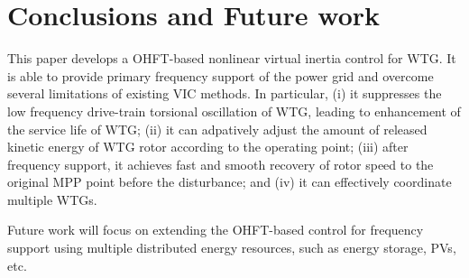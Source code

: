 \documentclass[journal]{IEEEtran}
\begin{document}
\section{Conclusions and Future work}
This paper develops a OHFT-based nonlinear virtual inertia control for WTG. It is able to provide primary frequency support of the power grid and overcome several limitations of existing VIC methods. In particular, (i) it suppresses the low frequency drive-train torsional oscillation of WTG, leading to enhancement of the service life of WTG; (ii) it can adpatively adjust the amount of released kinetic energy of WTG rotor according to the operating point; (iii) after frequency support, it achieves fast and smooth recovery of rotor speed to the original MPP point before the disturbance; and (iv) it can effectively coordinate multiple WTGs. 

Future work will focus on extending the OHFT-based control for frequency support using multiple distributed energy resources, such as energy storage, PVs, etc.
\end{document}
